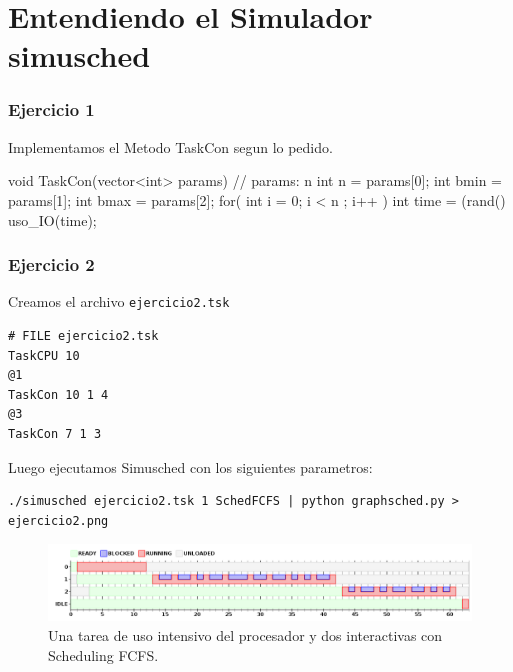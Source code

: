 


\part{Entendiendo el Simulador simusched}

\section{Ejercicio 1}

Implementamos el Metodo TaskCon segun lo pedido.

\begin{framed}
\begin{verbatimtab}
void TaskCon(vector<int> params) { // params: n
	int n = params[0];
	int bmin = params[1];
	int bmax = params[2];
	for( int i = 0; i < n ; i++ ) {
		int time = (rand()%
		uso_IO(time);
	}
}
\end{verbatimtab}
\end{framed}

\section{Ejercicio 2}

Creamos el archivo \verb|ejercicio2.tsk|

\begin{framed}
\begin{verbatim}
# FILE ejercicio2.tsk
TaskCPU 10
@1
TaskCon 10 1 4
@3
TaskCon 7 1 3
\end{verbatim}
\end{framed}


Luego ejecutamos Simusched con los siguientes parametros:

\begin{framed}
\begin{verbatim}
./simusched ejercicio2.tsk 1 SchedFCFS | python graphsched.py > ejercicio2.png
\end{verbatim}
\end{framed}

\begin{figure}[h!]
  \caption{Una tarea de uso intensivo del procesador y dos interactivas con Scheduling FCFS.}
  \centering
    \includegraphics[width=1\textwidth]{img/ejercicio2.png}
\end{figure}


